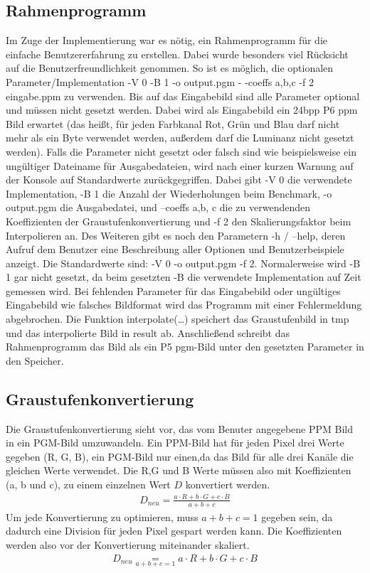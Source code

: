 \documentclass[course=erap]{aspdoc}
\begin{document}
\subsection{Rahmenprogramm}
Im Zuge der Implementierung war es nötig, ein Rahmenprogramm für die einfache Benutzererfahrung zu erstellen. Dabei wurde besonders viel Rücksicht auf die Benutzerfreundlichkeit genommen. So ist es möglich, die optionalen Parameter/Implementation -V 0 -B 1 -o output.pgm - -coeffs a,b,c -f 2 eingabe.ppm zu verwenden. Bis auf das Eingabebild sind alle Parameter optional und müssen nicht gesetzt werden. Dabei wird als Eingabebild ein 24bpp P6 ppm Bild erwartet (das heißt, für jeden Farbkanal Rot, Grün und Blau darf nicht mehr als ein Byte verwendet werden, außerdem darf die Luminanz nicht gesetzt werden). Falls die Parameter nicht gesetzt oder falsch sind wie beispielsweise ein ungültiger Dateiname für Ausgabedateien, wird nach einer kurzen Warnung auf der Konsole auf Standardwerte zurückgegriffen. Dabei gibt -V 0 die verwendete Implementation, -B 1 die Anzahl der Wiederholungen beim Benchmark, -o output.pgm die Ausgabedatei, und --coeffs a,b, c die zu verwendenden Koeffizienten der Graustufenkonvertierung und -f 2 den Skalierungsfaktor beim Interpolieren an. Des Weiteren gibt es noch den Parametern -h / --help, deren Aufruf dem Benutzer eine Beschreibung aller Optionen und Benutzerbeispiele anzeigt. Die Standardwerte sind: -V 0 -o output.pgm -f 2. Normalerweise wird -B 1 gar nicht gesetzt, da beim gesetzten -B die verwendete Implementation auf Zeit gemessen wird. Bei fehlenden Parameter für das Eingabebild oder ungültiges Eingabebild wie falsches Bildformat wird das Programm mit einer Fehlermeldung abgebrochen. Die Funktion interpolate(…) speichert das Graustufenbild in tmp und das interpolierte Bild in result ab. Anschließend schreibt das Rahmenprogramm das Bild als ein P5 pgm-Bild unter den gesetzten Parameter in den Speicher.

\subsection{Graustufenkonvertierung}
Die Graustufenkonvertierung sieht vor, das vom Benuter angegebene PPM Bild in ein PGM-Bild umzuwandeln. Ein PPM-Bild hat für jeden Pixel drei Werte gegeben (R, G, B), ein PGM-Bild nur einen,da das Bild für alle drei Kanäle die gleichen Werte verwendet. Die R,G und B Werte müssen also mit Koeffizienten (a, b und c), zu einem einzelnen Wert $D$ konvertiert werden.
 \begin{align}
    D_{neu} {=} \frac{a \cdot R + b \cdot G + c \cdot B}{a + b + c}
\end{align}
Um jede Konvertierung zu optimieren, muss $a + b + c = 1$ gegeben sein, da dadurch eine Division für jeden Pixel gespart werden kann. Die Koeffizienten werden also vor der Konvertierung miteinander skaliert.
 \begin{align}
    D_{neu} \underset{a + b + c = 1}{=} a \cdot R + b \cdot G + c \cdot B
\end{align}
\end{document}
